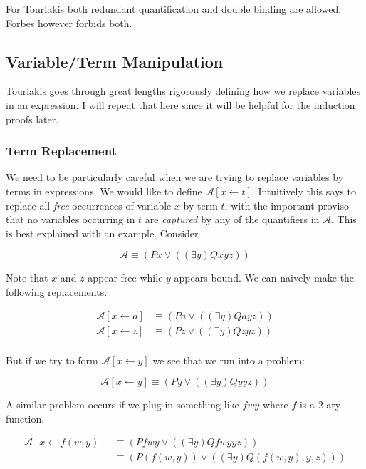 \documentclass[12pt]{article}
\newcommand{\mc}[1]{\mathcal{#1}}
\begin{document}
For Tourlakis both redundant quantification and double binding are allowed. Forbes however forbids both.

\subsection*{Variable/Term Manipulation}

Tourlakis goes through great lengths rigorously defining how we replace variables in an expression. I will repeat that here since it will be helpful for the induction proofs later.

\subsubsection*{Term Replacement}

We need to be particularly careful when we are trying to replace variables by terms in expressions. We would like to define $\mc{A}[x \leftarrow t]$. Intuitively this says to replace all \textit{free} occurrences of variable $x$ by term $t$, with the important proviso that no variables occurring in $t$ are \textit{captured} by any of the quantifiers in $\mc{A}$. This is best explained with an example. Consider

$$
\mc{A} \equiv (Px \lor ((\exists y)Qxyz))
$$

Note that $x$ and $z$ appear free while $y$ appears bound.
We can naively make the following replacements:

\begin{equation}
\begin{split}
\mc{A}[x\leftarrow a] &\equiv (Pa \lor ((\exists y)Qayz))\\
\mc{A}[x\leftarrow z] &\equiv (Pz \lor ((\exists y)Qzyz))\\
\end{split}
\end{equation}

But if we try to form $\mc{A}[x\leftarrow y]$ we see that we run into a problem:

\begin{equation}
\mc{A}[x\leftarrow y] \equiv (Py \lor ((\exists y)Qyyz))
\end{equation}

A similar problem occurs if we plug in something like $fwy$ where $f$ is a $2$-ary function.

\begin{equation}
\begin{split}
\mc{A}[x\leftarrow f(w,y)] &\equiv (Pfwy \lor ((\exists y)Qfwyyz))\\
&\equiv (P(f(w,y)) \lor ((\exists y)Q(f(w,y),y,z)))\\
\end{split}
\end{equation}
\end{document}
